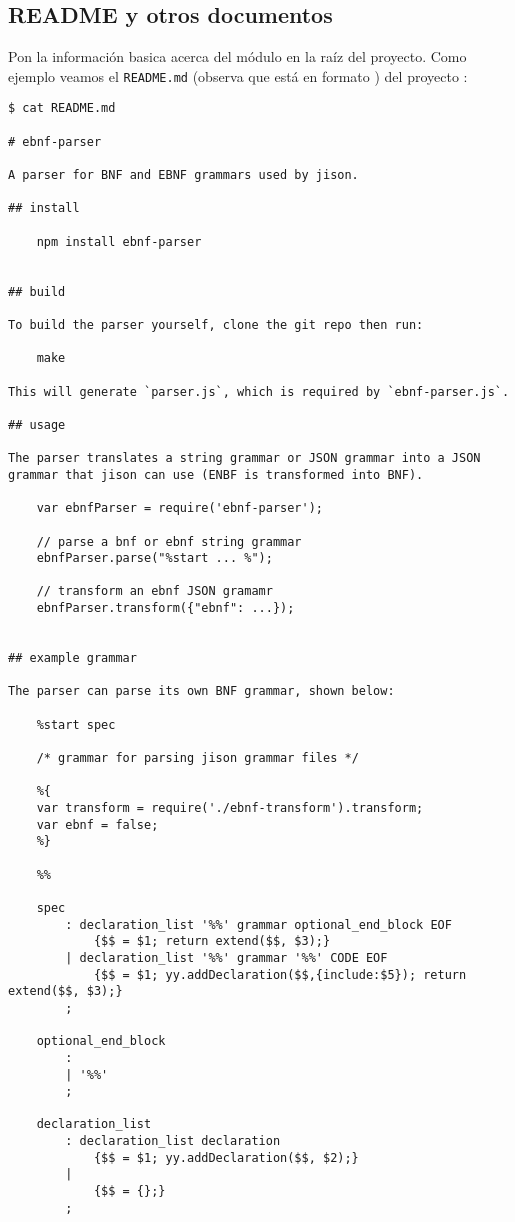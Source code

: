 \subsection{README y otros documentos}

Pon la información basica acerca del módulo 
en la raíz del proyecto.
Como ejemplo veamos el \verb|README.md| (observa que 
está en formato \markdown{}) 
del proyecto \ebnfparser{}:

\begin{verbatim}
$ cat README.md 

# ebnf-parser

A parser for BNF and EBNF grammars used by jison.

## install

    npm install ebnf-parser


## build

To build the parser yourself, clone the git repo then run:

    make

This will generate `parser.js`, which is required by `ebnf-parser.js`.

## usage

The parser translates a string grammar or JSON grammar into a JSON grammar that jison can use (ENBF is transformed into BNF).

    var ebnfParser = require('ebnf-parser');

    // parse a bnf or ebnf string grammar
    ebnfParser.parse("%start ... %");

    // transform an ebnf JSON gramamr
    ebnfParser.transform({"ebnf": ...});


## example grammar

The parser can parse its own BNF grammar, shown below:

    %start spec

    /* grammar for parsing jison grammar files */

    %{
    var transform = require('./ebnf-transform').transform;
    var ebnf = false;
    %}

    %%

    spec
        : declaration_list '%%' grammar optional_end_block EOF
            {$$ = $1; return extend($$, $3);}
        | declaration_list '%%' grammar '%%' CODE EOF
            {$$ = $1; yy.addDeclaration($$,{include:$5}); return extend($$, $3);}
        ;

    optional_end_block
        :
        | '%%'
        ;

    declaration_list
        : declaration_list declaration
            {$$ = $1; yy.addDeclaration($$, $2);}
        |
            {$$ = {};}
        ;


\end{verbatim}
